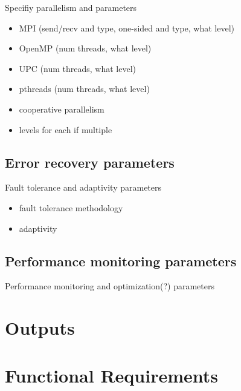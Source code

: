 \documentclass{book}
\begin{document}
Specifiy parallelism and parameters

\begin{itemize}
\item MPI (send/recv and type, one-sided and type, what level)
\item OpenMP (num threads, what level)
\item UPC (num threads, what level)
\item pthreads (num threads, what level)
\item cooperative parallelism
\item levels for each if multiple
\end{itemize}

\section{Error recovery parameters} \label{s:error}

Fault tolerance and adaptivity parameters

\begin{itemize}
\item fault tolerance methodology
\item adaptivity
\end{itemize}

\section{Performance monitoring parameters} \label{s:performance}

Performance monitoring and optimization(?) parameters

\chapter{Outputs} \label{s:inputs}

\chapter{Functional Requirements}
\end{document}
